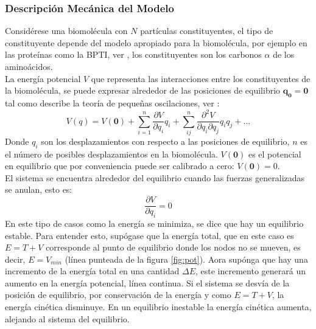 \subsubsection{Descripci\'{o}n Mec\'{a}nica del Modelo}

Consid\'{e}rese una biomol\'{e}cula con $N$ part\'{i}culas constituyentes, el tipo de constituyente depende del modelo apropiado para la biomol\'{e}cula, por ejemplo en las prote\'{i}nas como la BPTI, ver \cite{Gur2013GlobalPredictions.}, los constituyentes son los carbonos $\alpha$ de los amino\'{a}cidos.\\

La energ\'{i}a potencial $V$ que representa las interacciones entre los constituyentes de la biomol\'{e}cula, se puede expresar alrededor de las posiciones de equilibrio $\mathbf{q_0}=\mathbf{0}$ tal como describe la teor\'{i}a de peque\~{n}as oscilaciones, ver \cite{Goldstein2001ClassicalMechanics}:
\begin{equation}
V(q)=V(\mathbf{0})+\sum_{i=1}^n\frac{\partial V}{\partial q_i}q_i+\sum_{ij}^{n}\frac{\partial^2 V }{\partial q_i\partial q_j}q_i q_j+...
\end{equation}\label{eq:1}
Donde $q_i$ son los desplazamientos con respecto a las posiciones de equilibrio, $n$ es el n\'{u}mero de posibles desplazamientos en la biomol\'{e}cula. $V(\mathbf{0})$ es el potencial en equilibrio que por conveniencia puede ser calibrado a cero: $V(\mathbf{0})=0$. \\


El sistema se encuentra alrededor del equilibrio cuando las fuerzas generalizadas se anulan, esto es:
\begin{equation}
\frac{\partial V}{\partial q_i}=0
\end{equation}\label{eq:2}
En este tipo de casos como la energ\'{i}a se minimiza, se dice que hay un equilibrio estable. Para entender esto, sup\'{o}gase que la energ\'{i}a total, que en este caso es $E=T+V$ corresponde al punto de equilibrio donde los nodos no se mueven, es decir, $E=V_{min}$ (l\'{i}nea punteada de la figura \ref{fig:pot}). Aora sup\'{o}nga que hay una incremento de la energ\'{i}a total en una cantidad $\Delta E$, este incremento generar\'{a} un aumento en la energ\'{i}a potencial, l\'{i}nea continua.  Si el sistema se desv\'{i}a de la posici\'{o}n de equilibrio, por conservaci\'{o}n de la energ\'{i}a y como $E=T+V$, la energ\'{i}a cin\'{e}tica disminuye. En un equilibrio inestable la energ\'{i}a cin\'{e}tica aumenta, alejando al sistema del equilibrio. \cite{Goldstein2001ClassicalMechanics} \\


